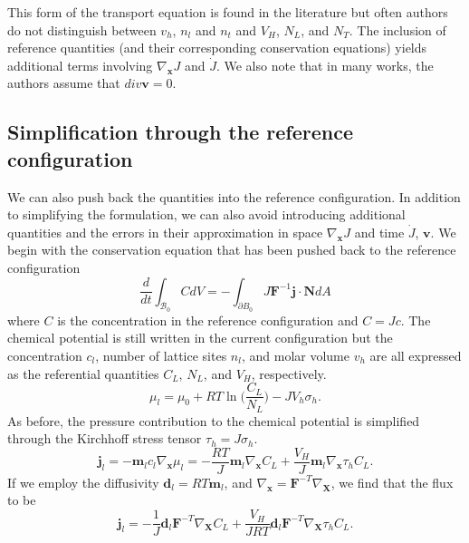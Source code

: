 \documentclass[10pt]{elsarticle}
\newcommand{\mbs}[1]{\boldsymbol{#1}}
\def\bs{{\mbs{s}}} \def\bt{{\mbs{t}}} \def\bu{{\mbs{u}}}
\def\bs{\boldsymbol}
\begin{document}
This form of the transport equation is found in the literature but often authors do not distinguish between $v_{h}$, $n_{l}$ and $n_{t}$ and $V_{H}$, $N_{L}$, and $N_{T}$. The inclusion of reference quantities (and their corresponding conservation equations) yields additional terms involving $\nabla_{\bs{x}}J$ and $\dot{J}$.  We also note that in many works, the authors assume that $div\bs{v} = 0$.  

\subsection{Simplification through the reference configuration}
 
We can also push back the quantities into the reference configuration. In addition to simplifying the formulation, we can also avoid introducing additional quantities and the errors in their approximation in space $\nabla_{\bs{x}}J$ and time  $\dot{J}$, $\bs{v}$. We begin with the conservation equation that has been pushed back to the reference configuration
%
\begin{equation}
\label{eq.hconservationref} \frac{d}{dt} \int_{\mathcal{B}_{0}} C dV = -\int_{\partial B_{0}} J\bs{F}^{-1}\bs{j} \cdot \bs{N} dA 
\end{equation}
where $C$ is the concentration in the reference configuration and $C = Jc$. The chemical potential is still written in the current configuration but the concentration $c_{l}$, number of lattice sites $n_{l}$, and molar volume $v_{h}$ are all expressed as the referential quantities $C_{L}$, $N_{L}$, and $V_{H}$, respectively.
%
\begin{equation}
\label{eq.chemical.potential}{\mu_{l} = \mu_{0} + R T \ln \bigg( \frac{C_{L}}{N_{L}} \bigg) - J V_{h} \sigma_{h}}.
\end{equation}
%
As before, the pressure contribution to the chemical potential is simplified through the Kirchhoff stress tensor $\tau_{h} = J\sigma_{h}$.
%
\begin{equation}
\label{eq.flux.ref}{\bs{j}_{l} = -\bs{m}_{l} c_{l} \nabla_{\bs{x}}\mu_{l}} =  -\frac{R T}{J}\bs{m}_{l}  \nabla_{\bs{x}}C_{L}  + \frac{ V_{H}}{J} \bs{m}_{l}  \nabla_{\bs{x}}\tau_{h}C_{L}.
\end{equation}
%
If we employ the diffusivity $\bs{d}_{l} = RT \bs{m}_{l}$, and $\nabla_{\bs{x}} = \bs{F}^{-T}\nabla_{\bs{X}}$, we find that the flux to be
%
\begin{equation}
\label{eq.flux.ref3}{\bs{j}_{l} = -\frac{1}{J} \bs{d}_{l} \bs{F}^{-T} \nabla_{\bs{X}}C_{L}  + \frac{V_{H}}{J R T} \bs{d}_{l}  \bs{F}^{-T} \nabla_{\bs{X}} \tau_{h}} C
_{L}.
\end{equation}
\end{document}
